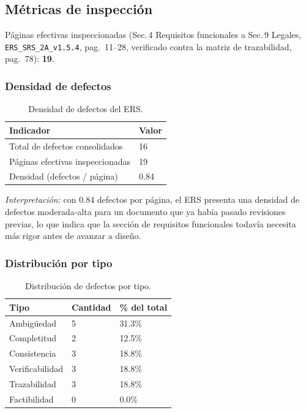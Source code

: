 \documentclass[11pt,a4paper]{article}
\begin{document}
\subsection{Métricas de inspección}
P\'aginas efectivas inspeccionadas (Sec.\,4 Requisitos funcionales a Sec.\,9 Legales, \texttt{ERS\_SRS\_2A\_v1.5.4}, pag.\ 11--28, verificado contra la matriz de trazabilidad, pag.\ 78): \textbf{19}.
 
\subsubsection{ Densidad de defectos}
 
\begin{table}[H]
\centering
\caption{Densidad de defectos del ERS.}
\renewcommand{\arraystretch}{1.25}
\begin{tabularx}{0.72\textwidth}{|Y|C{2.7cm}|}
\hline
\textbf{Indicador} & \textbf{Valor} \\ \hline
Total de defectos consolidados & 16 \\ \hline
P\'aginas efectivas inspeccionadas & 19 \\ \hline
Densidad (defectos / p\'agina) & 0.84 \\ \hline
\end{tabularx}
\end{table}
 
\textit{Interpretaci\'on:} con 0.84 defectos por p\'agina, el ERS presenta una densidad de defectos moderada-alta para un documento que ya hab\'ia pasado revisiones previas, lo que indica que la secci\'on de requisitos funcionales todav\'ia necesita m\'as rigor antes de avanzar a dise\~no.
 
\subsubsection{ Distribuci\'on por tipo}
 
\begin{table}[H]
\centering
\caption{Distribuci\'on de defectos por tipo.}
\renewcommand{\arraystretch}{1.25}
\begin{tabularx}{0.72\textwidth}{|Y|C{2.5cm}|C{2.8cm}|}
\hline
\textbf{Tipo} & \textbf{Cantidad} & \textbf{\% del total} \\ \hline
Ambig\"uedad & 5 & 31.3\% \\ \hline
Completitud & 2 & 12.5\% \\ \hline
Consistencia & 3 & 18.8\% \\ \hline
Verificabilidad & 3 & 18.8\% \\ \hline
Trazabilidad & 3 & 18.8\% \\ \hline
Factibilidad & 0 & 0.0\% \\ \hline
\end{tabularx}
\end{table}
 
\end{document}
